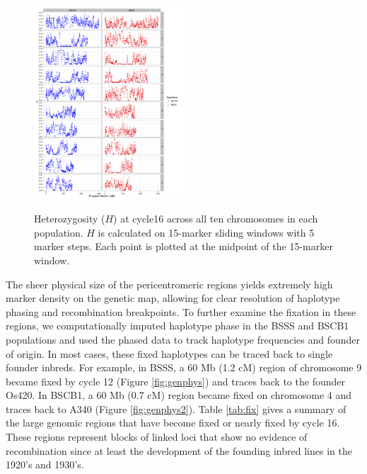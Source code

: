 \begin{figure}[tb]   
  \begin{center}
   \vspace{-0mm}
   \includegraphics[width=0.5\textwidth]{fig3}
   \renewcommand{\baselinestretch}{0.9}
   \vspace{-3mm}
   \caption{ Heterozygosity ($H$) at cycle16 across all ten chromosomes in each population.  $H$ is calculated on 15-marker sliding windows with 5 marker steps. Each point is plotted at the midpoint of the 15-marker window. 
} 
\vspace{-6mm}
    \label{fig:heterotic}
  \end{center}
\end{figure}

The sheer physical size of the pericentromeric regions yields extremely high marker density on the genetic map, allowing for clear resolution of haplotype phasing and recombination breakpoints. 
To further examine the fixation in these regions, we computationally imputed haplotype phase in the BSSS and BSCB1 populations and used the phased data to track haplotype frequencies and founder of origin. 
In most cases, these fixed haplotypes can be traced back to single founder inbreds. 
For example, in BSSS, a 60 Mb (1.2 cM) region of chromosome 9 became fixed by cycle 12 (Figure \ref{fig:genphys}) and traces back to the founder Os420. 
In BSCB1, a 60 Mb (0.7 cM) region became fixed on chromosome 4 and traces back to A340 (Figure \ref{fig:genphys2}). 
Table \ref{tab:fix} gives a summary of the large genomic regions that have become fixed or nearly fixed by cycle 16. 
These regions represent blocks of linked loci that show no evidence of recombination since at least the development of the founding inbred lines in the 1920’s and 1930’s.
	
